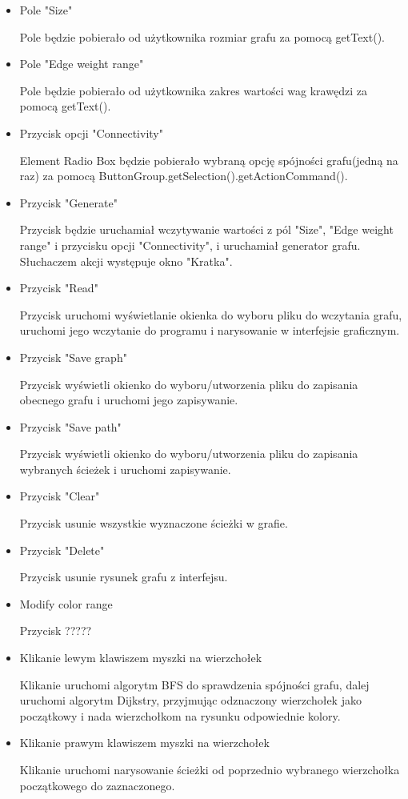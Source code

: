 \documentclass[]{article}
\begin{document}
\begin{itemize}
    \item Pole "Size"
    
    Pole będzie pobierało od użytkownika rozmiar grafu za pomocą getText().
    \item Pole "Edge weight range"
    
    Pole będzie pobierało od użytkownika zakres wartości wag krawędzi za pomocą getText().
    \item Przycisk opcji "Connectivity"
    
    Element Radio Box będzie pobierało wybraną opcję spójności grafu(jedną na raz) za pomocą ButtonGroup.getSelection().getActionCommand().
    \item Przycisk "Generate"
    
    Przycisk będzie uruchamiał wczytywanie wartości z pól "Size", "Edge weight range" i przycisku opcji "Connectivity", i uruchamiał generator grafu. Słuchaczem akcji występuje okno "Kratka".
    \item Przycisk "Read"
    
    Przycisk uruchomi wyświetlanie okienka do wyboru pliku do wczytania grafu, uruchomi jego wczytanie do programu i narysowanie w interfejsie graficznym.
    \item Przycisk "Save graph"
    
    Przycisk wyświetli okienko do wyboru/utworzenia pliku do zapisania obecnego grafu i uruchomi jego zapisywanie.
    \item Przycisk "Save path"
    
    Przycisk wyświetli okienko do wyboru/utworzenia pliku do zapisania wybranych ścieżek i uruchomi zapisywanie.
    \item Przycisk "Clear"
    
    Przycisk usunie wszystkie wyznaczone ścieżki w grafie.
    \item Przycisk "Delete"
    
    Przycisk usunie rysunek grafu z interfejsu.
    \item Modify color range
    
    Przycisk ?????
    \item Klikanie lewym klawiszem myszki na wierzchołek
    
    Klikanie uruchomi algorytm BFS do sprawdzenia spójności grafu, dalej uruchomi algorytm Dijkstry, przyjmując odznaczony wierzchołek jako początkowy i nada wierzchołkom na rysunku odpowiednie kolory. 
    
    \item Klikanie prawym klawiszem myszki na wierzchołek
    
    Klikanie uruchomi narysowanie ścieżki od poprzednio wybranego wierzchołka początkowego do zaznaczonego.
\end{itemize}
\end{document}
